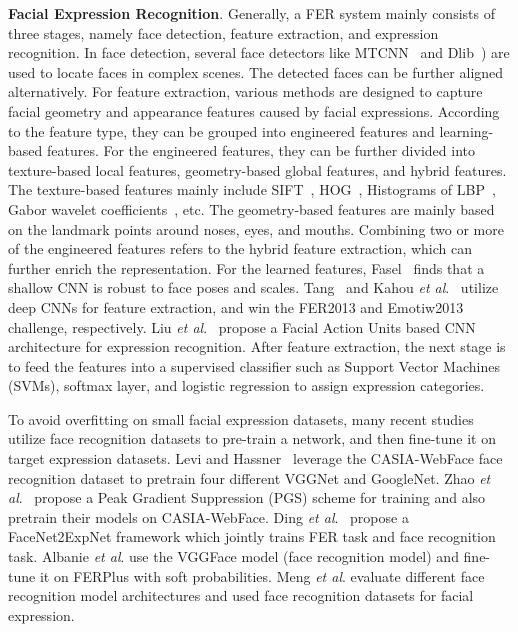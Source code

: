 \documentclass[journal]{IEEEtran}
\newcommand{\pxj}[1]{\textcolor[rgb]{0,0,0}{#1}}
\newcommand{\rpxj}[1]{\textcolor[rgb]{0,0,0}{#1}}
\begin{document}
\textbf{Facial Expression Recognition}.
\pxj{Generally, a FER system mainly consists of three stages, namely face detection, feature extraction, and expression recognition. 
In face detection, several face detectors like MTCNN~\cite{7553523} and Dlib~\cite{amos2016openface}) are used to locate faces in complex scenes. The detected faces can be further aligned alternatively. For feature extraction, various methods are designed to capture facial geometry and appearance features caused by facial expressions. According to the feature type, they can be grouped into engineered features and learning-based features. For the engineered features, they can be further divided into texture-based local features, geometry-based global features, and hybrid features. The texture-based features mainly include SIFT~\cite{sift}, HOG~\cite{1467360}, Histograms of LBP~\cite{SHAN2009803}, Gabor wavelet coefficients~\cite{999679}, etc. The geometry-based features are mainly based on the landmark points around noses, eyes, and mouths. Combining two or more of the engineered features refers to the hybrid feature extraction, which can further enrich the representation. 
For the learned features, Fasel~\cite{Fasel2002Robust} finds that a shallow CNN is robust to face poses and scales. Tang~\cite{Tang2013Deep} and Kahou \textit{et al}.~\cite{Kahou2013Combining} utilize deep CNNs for feature extraction, and win the FER2013 and Emotiw2013 challenge, respectively. Liu \textit{et al}.~\cite{Liu2015AU} propose a Facial Action Units based CNN architecture for expression recognition. After feature extraction, the next stage is to feed the features into a supervised classifier such as Support Vector Machines (SVMs), softmax layer, and logistic regression to assign expression categories.} 

\rpxj{To avoid overfitting on small facial expression datasets, many recent studies~\cite{meng2019frame, albanie2018emotion, tan2017group, levi2015emotion, zhao2016peak, 7961731} utilize face recognition datasets to pre-train a network, and then fine-tune it on target expression datasets. Levi and Hassner~\cite{levi2015emotion} leverage the CASIA-WebFace\cite{yi2014learning} face recognition dataset to pretrain four different VGGNet\cite{simonyan2014very} and GoogleNet\cite{szegedy2015going}. Zhao \textit{et al}.~\cite{zhao2016peak} propose a Peak Gradient Suppression (PGS) scheme for training and also pretrain their models on CASIA-WebFace. Ding \textit{et al}.~\cite{7961731} propose a FaceNet2ExpNet framework which jointly trains FER task and face recognition task. Albanie \textit{et al}. use the VGGFace model (face recognition model) and fine-tune it on FERPlus with soft probabilities. Meng \textit{et al}. evaluate different face recognition model architectures and used face recognition datasets for facial expression. }
\end{document}
